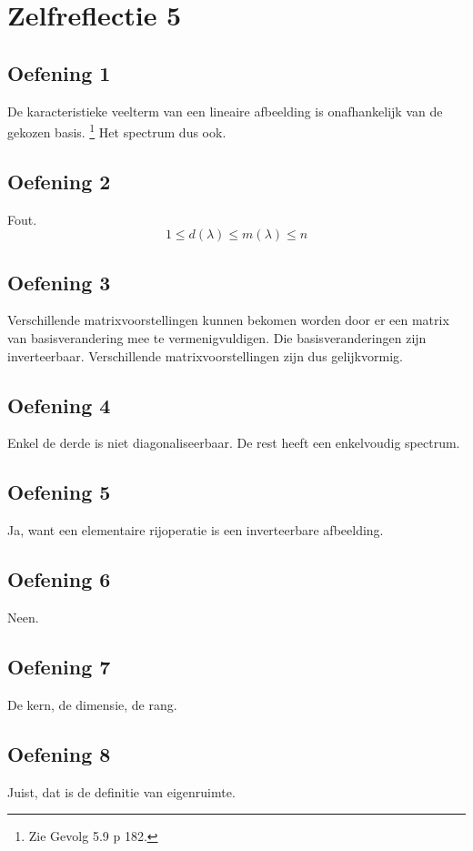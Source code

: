 \documentclass[lineaire_algebra_oplossingen.tex]{subfiles}
\begin{document}
\section{Zelfreflectie 5}
\subsection{Oefening 1}
De karacteristieke veelterm van een lineaire afbeelding is onafhankelijk van de gekozen basis. \footnote{Zie Gevolg 5.9 p 182.}
Het spectrum dus ook.

\subsection{Oefening 2}
Fout.
\[
1 \le d(\lambda) \le m(\lambda) \le n
\]

\subsection{Oefening 3}
Verschillende matrixvoorstellingen kunnen bekomen worden door er een matrix van basisverandering mee te vermenigvuldigen.
Die basisveranderingen zijn inverteerbaar. 
Verschillende matrixvoorstellingen zijn dus gelijkvormig.

\subsection{Oefening 4}
Enkel de derde is niet diagonaliseerbaar. De rest heeft een enkelvoudig spectrum.

\subsection{Oefening 5}
Ja, want een elementaire rijoperatie is een inverteerbare afbeelding.

\subsection{Oefening 6}
Neen.

\subsection{Oefening 7}
De kern, de dimensie, de rang. 

\subsection{Oefening 8}
Juist, dat is de definitie van eigenruimte.
\end{document}
